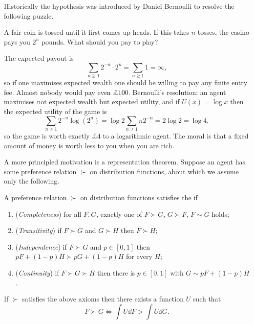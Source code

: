 Historically the hypothesis was introduced by Daniel Bernoulli to resolve the following puzzle.

\begin{example}
	A fair coin is tossed until it first comes up heads. If this takes $n$ tosses, the casino pays you $2^n$ pounds. What should you pay to play?

	The expected payout is
	$$
	\sum_{n\geq 1} 2^{-n}\cdot 2^n = \sum_{n \geq 1} 1 = \infty,
	$$
	so if one maximises expected wealth one should be willing to pay any finite entry fee. Almost nobody would pay even $\pounds 100$. Bernoulli's resolution: an agent maximises not expected wealth but expected utility, and if $U(x) = \log x$ then the expected utility of the game is
	$$
	\sum_{n \geq 1}2^{-n}\log(2^n) = \log 2\sum_{n\geq 1}n2^{-n} = 2\log 2 = \log 4,
	$$
	so the game is worth exactly $\pounds 4$ to a logarithmic agent. The moral is that a fixed amount of money is worth less to you when you are rich.
\end{example}

A more principled motivation is a representation theorem. Suppose an agent has some preference relation $\succ$ on distribution functions, about which we assume only the following.

\begin{definition}
	A preference relation $\succ$ on distribution functions satisfies the  if
	\begin{enumerate}[label=(\roman*)]
		\item (\emph{Completeness}) for all $F,G$, exactly one of $F \succ G$, $G \succ F$, $F \sim G$ holds;
		\item (\emph{Transitivity}) if $F \succ G$ and $G \succ H$ then $F \succ H$;
		\item (\emph{Independence}) if $F \succ G$ and $p \in [0,1]$ then $pF + (1-p)H \succ pG + (1-p)H$ for every $H$;
		\item (\emph{Continuity}) if $F \succ G \succ H$ then there is $p \in [0,1]$ with $G \sim pF + (1-p)H$.
	\end{enumerate}
\end{definition}

\begin{theorem}
	If $\succ$ satisfies the above axioms then there exists a function $U$ such that
	$$
	F \succ G \iff \int U \dd F > \int U \dd G.
	$$
\end{theorem}

